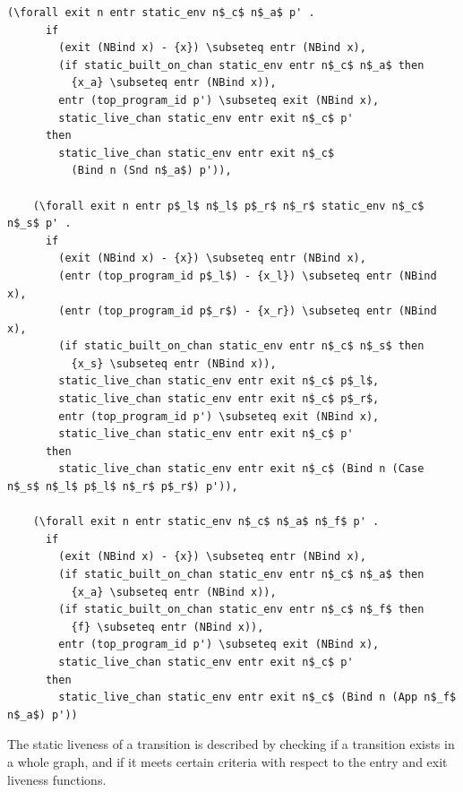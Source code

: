 \documentclass[10pt]{article}
\begin{document}
\begin{lstlisting}[language=logic, mathescape]
    (\forall exit n entr static_env n$_c$ n$_a$ p' .
      if 
        (exit (NBind x) - {x}) \subseteq entr (NBind x),
        (if static_built_on_chan static_env entr n$_c$ n$_a$ then
          {x_a} \subseteq entr (NBind x)),
        entr (top_program_id p') \subseteq exit (NBind x),
        static_live_chan static_env entr exit n$_c$ p'
      then
        static_live_chan static_env entr exit n$_c$
          (Bind n (Snd n$_a$) p')),

    (\forall exit n entr p$_l$ n$_l$ p$_r$ n$_r$ static_env n$_c$ n$_s$ p' .
      if 
        (exit (NBind x) - {x}) \subseteq entr (NBind x),
        (entr (top_program_id p$_l$) - {x_l}) \subseteq entr (NBind x),
        (entr (top_program_id p$_r$) - {x_r}) \subseteq entr (NBind x),
        (if static_built_on_chan static_env entr n$_c$ n$_s$ then
          {x_s} \subseteq entr (NBind x)),
        static_live_chan static_env entr exit n$_c$ p$_l$,
        static_live_chan static_env entr exit n$_c$ p$_r$,
        entr (top_program_id p') \subseteq exit (NBind x),
        static_live_chan static_env entr exit n$_c$ p'
      then 
        static_live_chan static_env entr exit n$_c$ (Bind n (Case n$_s$ n$_l$ p$_l$ n$_r$ p$_r$) p')),

    (\forall exit n entr static_env n$_c$ n$_a$ n$_f$ p' .
      if
        (exit (NBind x) - {x}) \subseteq entr (NBind x),
        (if static_built_on_chan static_env entr n$_c$ n$_a$ then
          {x_a} \subseteq entr (NBind x)),
        (if static_built_on_chan static_env entr n$_c$ n$_f$ then
          {f} \subseteq entr (NBind x)),
        entr (top_program_id p') \subseteq exit (NBind x),
        static_live_chan static_env entr exit n$_c$ p'
      then
        static_live_chan static_env entr exit n$_c$ (Bind n (App n$_f$ n$_a$) p'))
  \end{lstlisting}

The static liveness of a transition is described by checking if a transition exists in a whole
graph, and if it meets certain criteria with respect to the entry and exit liveness
functions. 
\end{document}
